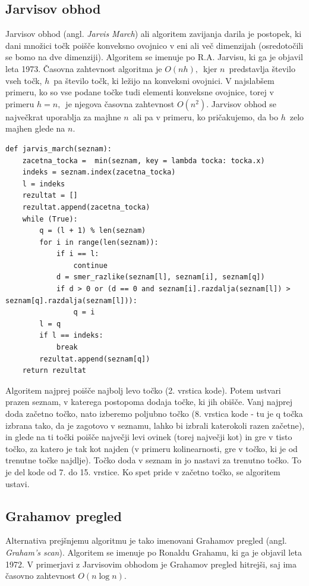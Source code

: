 \documentclass[a4paper]{article}
\begin{document}
\subsection{Jarvisov obhod}
Jarvisov obhod (angl. \textit{Jarvis March}) ali algoritem zavijanja darila je postopek, ki dani množici točk poišče konveksno ovojnico v eni ali več dimenzijah (osredotočili se 
bomo na dve dimenziji). Algoritem se imenuje po R.A. Jarvisu, ki ga je objavil leta 1973. Časovna zahtevnost algoritma je $O(nh),$~kjer $n$~predstavlja število vseh točk, $h$~pa 
število točk, ki ležijo na konveksni ovojnici. V najslabšem primeru, ko so vse podane točke tudi elementi konveksne ovojnice, torej v primeru $h = n,$~je njegova časovna zahtevnost 
$O(n^2)$. Jarvisov obhod se največkrat uporablja za majhne $n$~ali pa v primeru, ko pričakujemo, da bo $h$~zelo majhen glede na $n$.

\begin{lstlisting}
def jarvis_march(seznam):
    zacetna_tocka =  min(seznam, key = lambda tocka: tocka.x)
    indeks = seznam.index(zacetna_tocka) 
    l = indeks
    rezultat = []
    rezultat.append(zacetna_tocka)
    while (True):
        q = (l + 1) % len(seznam)      
        for i in range(len(seznam)):
            if i == l:
                continue
            d = smer_razlike(seznam[l], seznam[i], seznam[q])
            if d > 0 or (d == 0 and seznam[i].razdalja(seznam[l]) > seznam[q].razdalja(seznam[l])):
                q = i
        l = q
        if l == indeks:
            break    
        rezultat.append(seznam[q])
    return rezultat
\end{lstlisting}

Algoritem najprej poišče najbolj levo točko (2. vrstica kode). Potem ustvari prazen seznam, v katerega postopoma dodaja točke, ki jih obišče. Vanj najprej doda začetno točko,
nato izberemo poljubno točko (8. vrstica kode - tu je q točka izbrana tako, da je zagotovo v seznamu, lahko bi izbrali katerokoli razen začetne), 
in glede na ti točki poišče največji levi ovinek (torej največji kot)
in gre v tisto točko, za katero je tak kot najden 
(v primeru kolinearnosti, gre v točko, ki je od trenutne točke najdlje). Točko doda v seznam 
in jo nastavi za trenutno točko. To je del kode od 7. do 15. vrstice. Ko spet pride v začetno točko, se algoritem ustavi.

\newpage
\subsection{Grahamov pregled}
Alternativa prejšnjemu algoritmu je tako imenovani Grahamov pregled (angl. \textit{Graham's scan}). Algoritem se imenuje po Ronaldu Grahamu, ki ga je objavil leta 1972. 
V primerjavi z Jarvisovim obhodom je Grahamov pregled hitrejši, saj ima časovno zahtevnost $O(n \log n)$.
\end{document}
